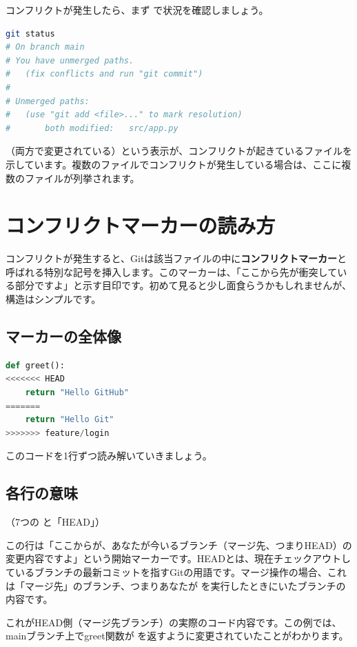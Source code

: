 コンフリクトが発生したら、まず  で状況を確認しましょう。

\begin{lstlisting}[language=bash]
git status
# On branch main
# You have unmerged paths.
#   (fix conflicts and run "git commit")
#
# Unmerged paths:
#   (use "git add <file>..." to mark resolution)
#       both modified:   src/app.py
\end{lstlisting}

（両方で変更されている）という表示が、コンフリクトが起きているファイルを示しています。複数のファイルでコンフリクトが発生している場合は、ここに複数のファイルが列挙されます。

\section{コンフリクトマーカーの読み方}

コンフリクトが発生すると、Gitは該当ファイルの中に\textbf{コンフリクトマーカー}と呼ばれる特別な記号を挿入します。このマーカーは、「ここから先が衝突している部分ですよ」と示す目印です。初めて見ると少し面食らうかもしれませんが、構造はシンプルです。

\subsection{マーカーの全体像}

\begin{lstlisting}[language=python]
def greet():
<<<<<<< HEAD
    return "Hello GitHub"
=======
    return "Hello Git"
>>>>>>> feature/login
\end{lstlisting}

このコードを1行ずつ読み解いていきましょう。

\subsection{各行の意味}

\textbf{}（7つの \cmd{<} と「HEAD」）

この行は「ここからが、あなたが今いるブランチ（マージ先、つまりHEAD）の変更内容ですよ」という開始マーカーです。HEADとは、現在チェックアウトしているブランチの最新コミットを指すGitの用語です。マージ操作の場合、これは「マージ先」のブランチ、つまりあなたが  を実行したときにいたブランチの内容です。

\textbf{}

これがHEAD側（マージ先ブランチ）の実際のコード内容です。この例では、mainブランチ上でgreet関数が  を返すように変更されていたことがわかります。

